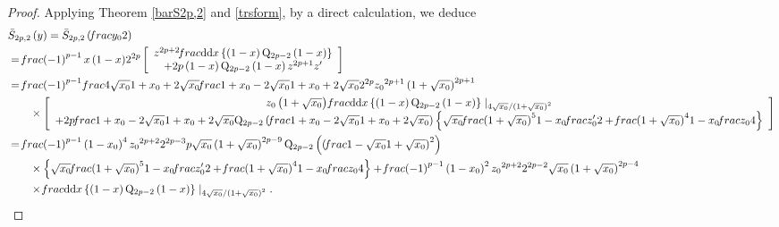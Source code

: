 \documentclass[11pt]{article}
\theoremstyle{plain}
\theoremstyle{definition}
\begin{document}
\begin{proof}
Applying Theorem \ref{barS2p,2} and \eqref{trsform}, by a direct calculation, we deduce
\begin{align}
	&\bar{S}_{2p,2}\left( y\right)=\bar{S}_{2p,2}\left( \frac{y_0}{2} \right)\\& =\frac{\left( -1 \right) ^{p-1}x\left( 1-x \right)}{2^{2p}}\left[ \begin{array}{c}
		z^{2p+2}\frac{\mathrm{d}}{\mathrm{d}x}\left\{ \left( 1-x \right) \mathrm{Q}_{2p-2}\left( 1-x \right) \right\}\\
		+2p\left( 1-x \right) \mathrm{Q}_{2p-2}\left( 1-x \right) z^{2p+1}z'\\
	\end{array} \right]
	\nonumber\\
	&=\frac{\left( -1 \right) ^{p-1}\frac{4\sqrt{x_0}}{1+x_0+2\sqrt{x_0}}\frac{1+x_0-2\sqrt{x_0}}{1+x_0+2\sqrt{x_0}}}{2^{2p}}{z_0}^{2p+1}\left( 1+\sqrt{x_0} \right) ^{2p+1}\nonumber\\&\quad\quad\times\left[ \begin{array}{c}
		z_0\left( 1+\sqrt{x_0} \right) 	\frac{\mathrm{d}}{\mathrm{d}x}\left\{ \left( 1-x \right) \mathrm{Q}_{2p-2}\left( 1-x \right) \right\} \mid_{4\sqrt{x_0}/\left( 1+\sqrt{x_0} \right) ^2}\\
		+2p\frac{1+x_0-2\sqrt{x_0}}{1+x_0+2\sqrt{x_0}}\mathrm{Q}_{2p-2}\left( \frac{1+x_0-2\sqrt{x_0}}{1+x_0+2\sqrt{x_0}} \right)
		\left\{ \sqrt{x_0}\frac{\left( 1+\sqrt{x_0} \right) ^5}{1-x_0}\frac{z_0'}{2}+\frac{\left( 1+\sqrt{x_0} \right) ^4}{1-x_0}\frac{z_0}{4} \right\}\\
	\end{array} \right] 	\nonumber\\
	&
	=\frac{\left( -1 \right) ^{p-1}\left( 1-x_0 \right) ^4{z_0}^{2p+2}}{2^{2p-3}}p\sqrt{x_0}\left( 1+\sqrt{x_0} \right) ^{2p-9}\mathrm{Q}_{2p-2}\left(
	\left( \frac{1-\sqrt{x_0}}{1+\sqrt{x_0}} \right) ^2
	 \right)\nonumber\\&\quad\quad\times \left\{ \sqrt{x_0}\frac{\left( 1+\sqrt{x_0} \right) ^5}{1-x_0}\frac{z_0'}{2}+\frac{\left( 1+\sqrt{x_0} \right) ^4}{1-x_0}\frac{z_0}{4} \right\}+\frac{\left( -1 \right) ^{p-1}\left( 1-x_0 \right) ^2{z_0}^{2p+2}}{2^{2p-2}}\sqrt{x_0}\left( 1+\sqrt{x_0} \right) ^{2p-4}
	\nonumber\\
	&\quad\quad\times
	\frac{\mathrm{d}}{\mathrm{d}x}\left\{ \left( 1-x \right) \mathrm{Q}_{2p-2}\left( 1-x \right) \right\} \mid_{4\sqrt{x_0}/\left( 1+\sqrt{x_0} \right) ^2}.
\label{Sbar{y/2}}
	\end{align}

\end{proof}
\end{document}
